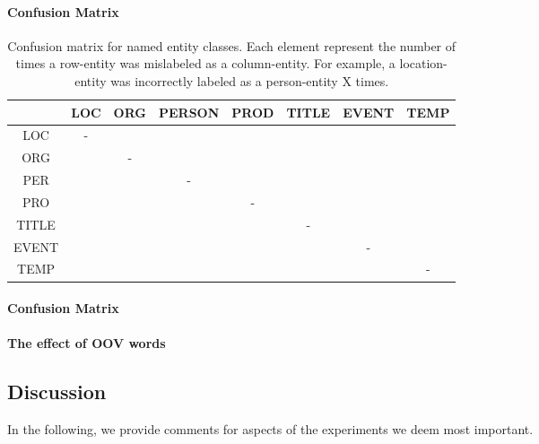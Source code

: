 \documentclass[11pt]{article}
\begin{document}
\paragraph{Confusion Matrix}


\begin{table}[t!]
\begin{center}
\begin{tabular}{cccccccc} 
& LOC & ORG & PERSON & PROD & TITLE & EVENT & TEMP \\
\hline
\noalign{\smallskip}
LOC  & - & & & & & &  \\
ORG  & & - & & & & &  \\
PER  & & & - & & & &  \\
PRO  & & & & - & & &  \\
TITLE  & & & & & - & &  \\
EVENT  & & & & & & - &  \\
TEMP  & & & & & & &  - \\
\end{tabular}
\end{center}
\caption{Confusion matrix for named entity classes. Each element represent the number of times a row-entity was mislabeled as a column-entity. For example, a location-entity was incorrectly labeled as a person-entity X times.}
\label{tab: confusion matrix}
\end{table}


\paragraph{Confusion Matrix}


\paragraph{The effect of OOV words}


\subsection{Discussion}
\label{sec: discussion}

In the following, we provide comments for aspects of the experiments we deem most important. 
\end{document}
